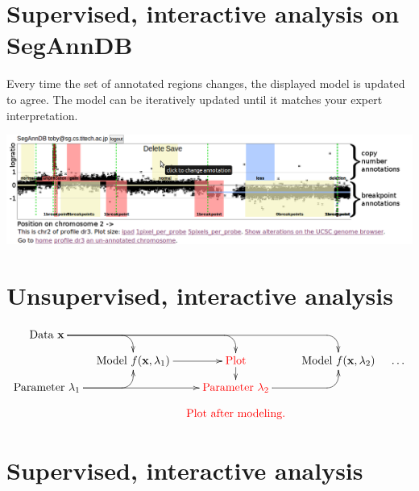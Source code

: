 \documentclass[a4paper,10pt]{article}
\begin{document}
\section*{Supervised, interactive analysis on SegAnnDB
  \citep{HOCKING-SegAnnDB}}

Every time the set of annotated regions changes, the displayed model
is updated to agree. The model can be iteratively updated until it
matches your expert interpretation.

\includegraphics[width=\textwidth]{new-new-annotations}

\newpage

\section*{Unsupervised, interactive analysis}
\begin{displaymath}
  \xymatrix@=0.3cm{
    \text{Data $\mathbf x$}
    \ar `[r] [dr] 
    \ar `r[rr] [drr] 
    \ar `r[rrr] [drrr] 
    & \text{ }
    & \text{ }
    & \text{ }
    \\
    & 
    \text{Model $f(\mathbf x, \lambda_1)$} 
    \ar [r]
    & 
    \textcolor{red}{\text{Plot}}
    \ar[d]
    &
    \text{Model $f(\mathbf x, \lambda_2)$} & \dots
    \\
    \text{Parameter $\lambda_1$}
    \ar `r[ru] [ru]
    \ar [rr]
    & \text{ }
    & \textcolor{red}{\text{Parameter $\lambda_2$}}
    \ar `r[ru] [ru] \\
    & &   \textcolor{red}{\text{Plot after modeling.}}
  }
\end{displaymath}

\section*{Supervised, interactive analysis}
\end{document}
